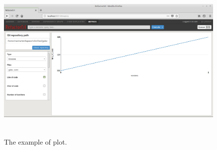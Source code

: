 \begin{figure}[h]
	\includegraphics[height=80mm]{figures/plot.png}
	\caption{The example of plot.}
	\label{fig:metrics_plot}
\end{figure}